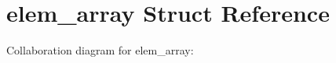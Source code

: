 \hypertarget{structelem__array}{}\section{elem\+\_\+array Struct Reference}
\label{structelem__array}


Collaboration diagram for elem\+\_\+array\+:
